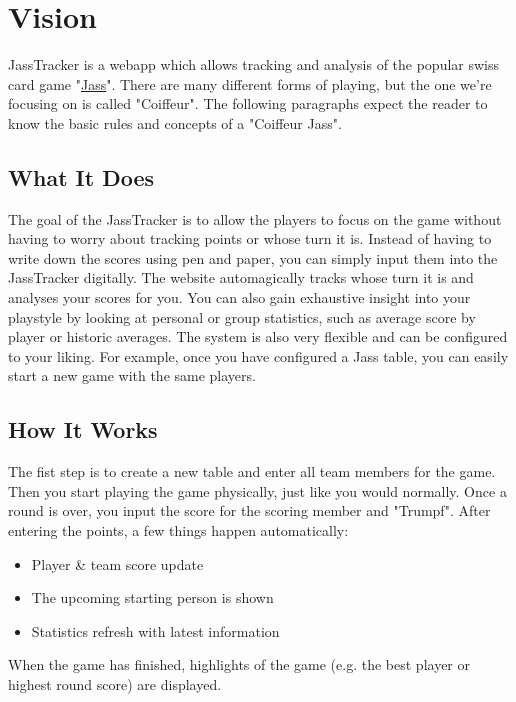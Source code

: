 \chapter{Vision}

JassTracker is a webapp which allows tracking and analysis of the popular swiss card game "\href{https://en.wikipedia.org/wiki/Jass}{Jass}".
There are many different forms of playing, but the one we're focusing on is called "Coiffeur".
The following paragraphs expect the reader to know the basic rules and concepts of a "Coiffeur Jass".

\section*{What It Does}
The goal of the JassTracker is to allow the players to focus on the game without having to worry about tracking points or whose turn it is.
Instead of having to write down the scores using pen and paper, you can simply input them into the JassTracker digitally.
The website automagically tracks whose turn it is and analyses your scores for you.
You can also gain exhaustive insight into your playstyle by looking at personal or group statistics, such as average score by player or historic averages.
The system is also very flexible and can be configured to your liking.
For example, once you have configured a Jass table, you can easily start a new game with the same players.

\section*{How It Works}
The fist step is to create a new table and enter all team members for the game.
Then you start playing the game physically, just like you would normally.
Once a round is over, you input the score for the scoring member and "Trumpf".
After entering the points, a few things happen automatically:
\begin{itemize}
    \item Player \& team score update
    \item The upcoming starting person is shown
    \item Statistics refresh with latest information
\end{itemize}
When the game has finished, highlights of the game (e.g. the best player or highest round score) are displayed.

